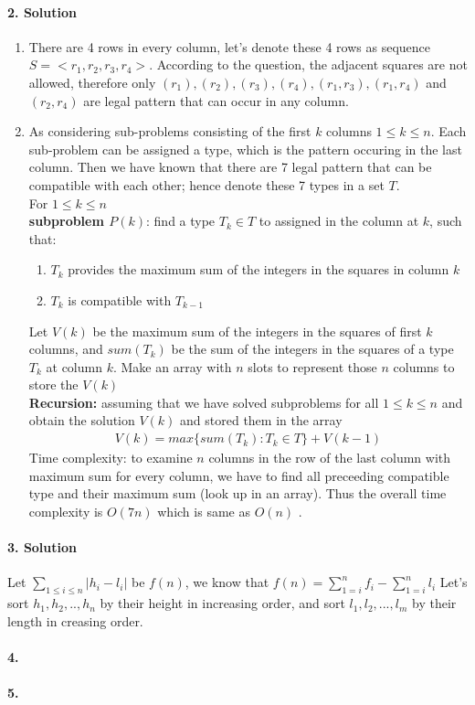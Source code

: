 \documentclass[a4paper]{scrartcl}
\begin{document}
\paragraph{2. Solution}
\label{sec:Question 2}
\begin{enumerate}[label=(\alph*)]
  \item There are 4 rows in every column, let's denote these 4 rows as sequence $S=\big<r_1,r_2,r_3,r_4\big>$.
  According to the question, the adjacent squares are not allowed, therefore only $(r_1), (r_2), (r_3), (r_4), (r_1, r_3), (r_1, r_4)$ and $(r_2, r_4)$ are legal pattern that can occur in any column. \\
  \item As considering sub-problems consisting of the first $k$ columns $1\leq k \leq n$. Each sub-problem can be assigned a type, which is the pattern occuring in the last column. Then we have known that there are 7 legal pattern that can be compatible with each other; hence denote these 7 types in a set $T$. \\ 
  For $1\leq k \leq n$\\
  \textbf{subproblem $P(k)$}: find a type $T_k \in T$ to assigned in the column at $k$, such that: 
  \begin{enumerate}[label=(\arabic{*})]
    \item $T_k$ provides the maximum sum of the integers in the squares in column $k$
    \item $T_k$ is compatible with $T_{k-1}$
  \end{enumerate}
  Let $V(k)$ be the maximum sum of the integers in the squares of first $k$ columns, and $sum(T_k)$ be the sum of the integers in the squares of a type $T_k$ at column $k$.
  Make an array with $n$ slots to represent those $n$ columns to store the $V(k)$\\
\textbf{Recursion:} assuming that we have solved subproblems for all $1\leq k \leq n$ and obtain the solution $V(k)$ and stored them in the array
\begin{align*}
  V(k)=  max\{ sum(T_k) : T_k \in T \} +V(k-1) 
\end{align*}
Time complexity: to examine $n$ columns in the row of the last column with maximum sum for every column, we have to find all preceeding compatible type and their maximum sum (look up in an array). Thus the overall time complexity is $O(7n)$ which is same as $O(n)$ .
\end{enumerate}
\paragraph{3. Solution}
\label{sec:Question 3}
Let $\sum_{1\leq i \leq n} |h_i - l_i|$ be $f(n)$, we know that $f(n) = \sum_{1=i}^{n} f_i -\sum_{1=i}^{n} l_i $
Let's sort $h_1,h_2,..,h_n$ by their height in increasing order, and sort $l_1,l_2,...,l_m$ by their length in creasing order.\\
\paragraph{4.}
\label{sec:Question 4}

\paragraph{5.}
\label{sec:Question 5}
\end{document}

